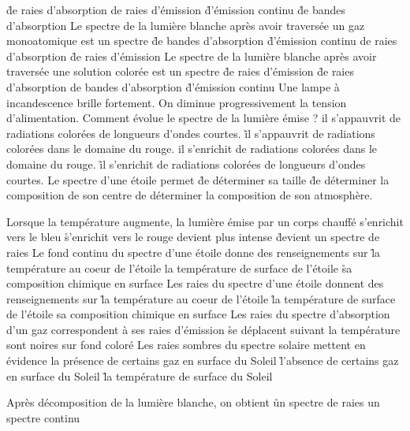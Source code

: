 \r
       de raies d'absorption
\rv
       de raies d'émission
\r
       d'émission continu
\r
       de bandes d'absorption
\q
Le spectre de la lumière blanche après avoir traversée un gaz monoatomique est un spectre
\r
       de bandes d'absorption
\r
       d'émission continu
\rv
       de raies d'absorption
\r
       de raies d'émission
\q
Le spectre de la lumière blanche après avoir traversée une solution colorée est un spectre
\r
       de raies d'émission
\r
       de raies d'absorption
\rv
       de bandes d'absorption
\r
       d'émission continu
\q
Une lampe à incandescence brille fortement. On diminue progressivement la tension d'alimentation. Comment évolue le spectre de la lumière émise ?
\rv
       il s'appauvrit de radiations colorées de longueurs d'ondes courtes.
\r
       il s'appauvrit de radiations colorées dans le domaine du rouge.
\rv
       il s'enrichit de radiations colorées dans le domaine du rouge.
\r
       il s'enrichit de radiations colorées de longueurs d'ondes courtes.
\q
Le spectre d'une étoile permet
\r
       de déterminer sa taille
\r
       de déterminer la composition de son centre
\rv
       de déterminer la composition de son atmosphère.

\q
Lorsque la température augmente, la lumière émise par un corps chauffé
\rv
s'enrichit vers le bleu
\r
s'enrichit vers le rouge
\rv
devient plus intense
\r
devient un spectre de raies
\q
Le fond continu du spectre d'une étoile donne des renseignements sur
\r
la température au coeur de l'étoile
\rv
la température de surface de l'étoile
\r
sa composition chimique en surface
\q
Les raies du spectre d'une étoile donnent des renseignements sur
\r
la température au coeur de l'étoile
\r
la température de surface de l'étoile
\rv
sa composition chimique en surface
\q
Les raies du spectre d'absorption d'un gaz
\rv
correspondent à ses raies d'émission
\r
se déplacent suivant la température
\rv
sont noires sur fond coloré
\q
Les raies sombres du spectre solaire mettent en évidence
\rv
la présence de certains gaz en surface du Soleil
\r
l'absence de certains gaz en surface du Soleil
\r
la température de surface du Soleil     

	\q
  Après décomposition de la lumière blanche, on obtient
	  \r
         un spectre de raies
	     \rv
       un spectre continu
